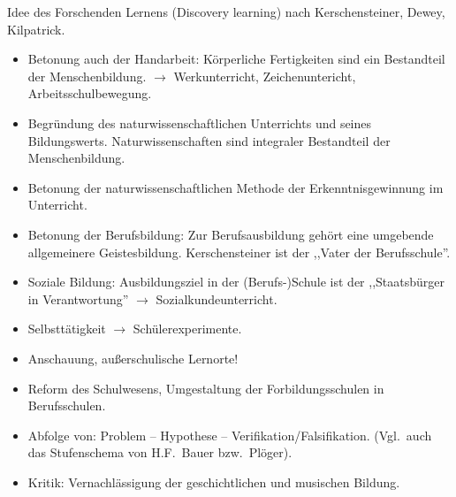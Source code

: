 \bip
Idee des Forschenden Lernens (Discovery learning) nach Kerschensteiner, Dewey, Kilpatrick.
\begin{itemize}
\item Betonung auch der Handarbeit: K\"{o}rperliche Fertigkeiten sind
ein Bestandteil der Menschenbildung.
$\to$ Werkunterricht, Zeichenuntericht, Arbeitsschulbewegung.
\item Begr\"{u}ndung des naturwissenschaftlichen Unterrichts und
seines Bildungswerts.
Naturwissenschaften sind integraler Bestandteil der Menschenbildung.
\item Betonung der naturwissenschaftlichen Methode der
Erkenntnisgewinnung im Unterricht.
\item Betonung der Berufsbildung: Zur Berufsausbildung geh\"{o}rt
eine umgebende allgemeinere Geistesbildung.
Kerschensteiner ist der ,,Vater der Berufsschule''.
\item Soziale Bildung: Ausbildungsziel in der (Berufs-)Schule ist
der ,,Staatsb\"{u}rger in Verantwortung'' $\to$ Sozialkundeunterricht.
\item Selbstt\"{a}tigkeit  $\to $ Sch\"{u}lerexperimente.
\item Anschauung, au{\ss}erschulische Lernorte!
\item Reform des Schulwesens, Umgestaltung der Forbildungsschulen
in Berufsschulen.
\item Abfolge von: Problem -- Hypothese -- Verifikation/Falsifikation.
(Vgl.\ auch das Stufenschema von H.F.\ Bauer bzw.\ Pl\"{o}ger).
\item Kritik: Vernachl\"{a}ssigung der geschichtlichen und
musischen Bildung.
\end{itemize}


\bip\bip
